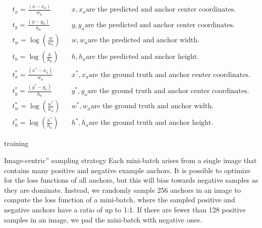 \documentclass{article}
\begin{document}
\begin{align*}
    t_x = \frac{(x - x_a)}{w_a} && x,x_a \text{are the predicted and anchor center coordinates.} \\
    t_y = \frac{(y - y_a)}{h_a} && y,y_a \text{are the predicted and anchor center coordinates.} \\
    t_w = \log(\frac{w}{w_a}) && w,w_a \text{are the predicted and anchor width.} \\
    t_h = \log(\frac{h}{h_a}) && h,h_a \text{are the predicted and anchor height.} \\
    t_x^* = \frac{(x^* - x_a)}{w_a} && x^*,x_a \text{are the ground truth and anchor center coordinates.} \\
    t_y^* = \frac{(y^* - y_a)}{h_a} && y^*,y_a \text{are the ground truth and anchor center coordinates.} \\
    t_w^* = \log(\frac{w^*}{w_a}) && w^*,w_a \text{are the ground truth and anchor width.} \\
    t_h^* = \log(\frac{h^*}{h_a}) && h^*,h_a \text{are the ground truth and anchor height.}
\end{align*}

training 

Image-centric” sampling strategy
Each mini-batch arises from a single image that contains many positive and negative example anchors. 
It is possible to optimize for the loss functions of all anchors, but this will bias towards negative samples as they are dominate.
Instead, we randomly sample 256 anchors in an image to compute the loss function of a mini-batch, where the sampled positive and negative anchors have a ratio of up to 1:1. 
If there are fewer than 128 positive samples in an image, we pad the mini-batch with negative ones.
\end{document}
